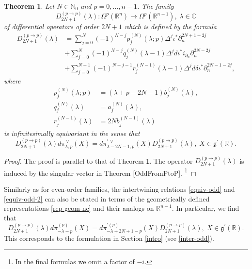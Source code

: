 \documentclass[a4paper,12pt,reqno]{amsart}
\newtheorem{theorem}{Theorem}
\numberwithin{theorem}{subsection}
\numberwithin{equation}{section}
\begin{document}
\begin{theorem}\label{OddDiffOp-type1} Let $N\in{\mathbb{N}}_0$ and $p=0,\dots,n-1$. The family
\begin{equation*}
   D_{2N+1}^{(p\to p)}(\lambda): \Omega^p({\mathbb{R}}^n) \to \Omega^{p}({\mathbb{R}}^{n-1}), \; \lambda \in {\mathbb{C}}
\end{equation*}
of differential operators of order $2N+1$ which is defined by the formula
\begin{align}\label{D-first-odd}
   D^{(p\to p)}_{2N+1}(\lambda) & = \sum_{j=0}^N(-1)^{N-j} p_j^{(N)}(\lambda;p)
   \Delta^j \iota^* \partial_n^{2N+1-2j} \nonumber\\
   & +\sum_{j=0}^N(-1)^{N-j} q_j^{(N)}(\lambda\!-\!1) \Delta^j {d}
   \iota^*i_{\partial_n}\partial_n^{2N-2j} \nonumber\\
   & +\sum_{j=0}^{N-1}(-1)^{N-j-1} r_j^{(N-1)}(\lambda\!-\!1) \Delta^j {d}
   \delta \iota^*\partial_n^{2N-1-2j},
\end{align}
where
\begin{align*}
   p_j^{(N)}(\lambda;p) & = (\lambda\!+\!p\!-\!2N\!-\!1) b_j^{(N)}(\lambda), \\
   q_j^{(N)}(\lambda) & = a_j^{(N)}(\lambda), \\
   r_j^{(N-1)}(\lambda) & = 2N b_j^{(N-1)}(\lambda)
\end{align*}
is infinitesimally equivariant in the sense that
\begin{equation}\label{equiv-odd-2}
   D^{(p\to p)}_{2N+1}(\lambda) {d}\pi^{{\,\vee}}_{\lambda,p} (X)
   = {d}\pi^{\prime {{\,\vee}}}_{\lambda-2N-1,p}(X) D^{(p\to p)}_{2N+1}(\lambda), \; X \in
   {{\mathfrak g}}^{\prime}({\mathbb{R}}).
\end{equation}
\end{theorem}

\begin{proof} The proof is parallel to that of Theorem \ref{OddDiffOp-type1}.
The operator $D^{(p\to p)}_{2N+1}(\lambda)$ is induced by the singular vector
in Theorem \ref{OddFromPtoP}. \footnote{In the final formulas we omit a factor
of $-i$.}
\end{proof}

Similarly as for even-order families, the intertwining relations
\eqref{equiv-odd} and \eqref{equiv-odd-2} can also be stated in terms of the
geometrically defined representations \eqref{rep-geom-nc} and their analogs on
${\mathbb{R}}^{n-1}$. In particular, we find that
\begin{equation*}
   D^{(p\to p)}_{2N+1}(\lambda) {d}\pi^{(p)}_{-\lambda-p}(X)
   = {d}\pi^{\prime (p)}_{-\lambda+2N+1-p}(X) D^{(p\to p)}_{2N+1}(\lambda), \; X \in {{\mathfrak g}}^{\prime}({\mathbb{R}}).
\end{equation*}
This corresponds to the formulation in Section \ref{intro} (see
\eqref{inter-odd}).
\end{document}
